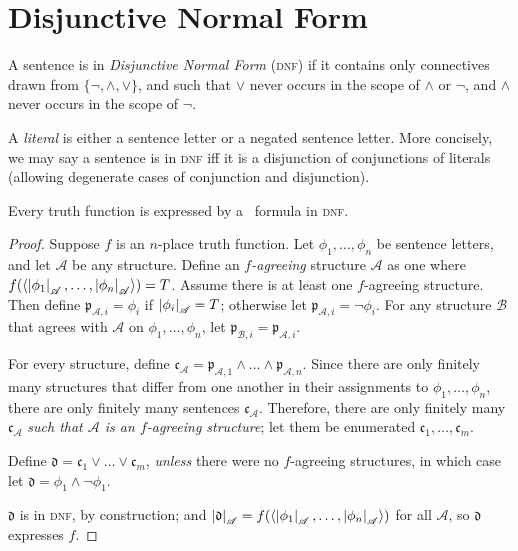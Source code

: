 

\section{Disjunctive Normal Form}


\begin{definition} A sentence is in \emph{Disjunctive Normal Form} (\textsc{\lowercase{DNF}}) if it contains only connectives drawn from $\{\neg,\wedge,\vee\}$, and such that $\vee$ never occurs in the scope of $\wedge$ or $\neg$, and $\wedge$ never occurs in the scope of $\neg$. \end{definition}

A \emph{literal} is either a sentence letter or a negated sentence letter. More concisely, we may say a sentence is in \textsc{\lowercase{DNF}} iff it is a disjunction of conjunctions of literals (allowing degenerate cases of conjunction and disjunction).

\begin{theorem}\label{dnf}
	Every truth function is expressed by a \lone\ formula in \textsc{\lowercase{DNF}}.
\begin{proof}	
Suppose $f$ is an $n$-place truth function. Let $\phi_{1},\ldots,\phi_{n}$ be  sentence letters, and let $\mathscr{A}$ be any structure.  Define an \emph{$f$-agreeing} structure $\mathscr{A}$ as one where $f(\langle\left|\phi_{1}\right|_{\mathscr{A}},\ldots,\left|\phi_{n}\right|_{\mathscr{A}}\rangle) = T$. Assume there is at least one $f$-agreeing structure. Then define $\mathfrak{p}_{\mathscr{A},i} = \phi_{i}$ if $\left|\phi_{i}\right|_{\mathscr{A}}=T$; otherwise let $\mathfrak{p}_{\mathscr{A},i} = \neg \phi_{i}$. 
For any structure $\mathscr{B}$ that agrees with $\mathscr{A}$ on $\phi_{1},\ldots,\phi_{n}$, let $\mathfrak{p}_{\mathscr{B},i}=\mathfrak{p}_{\mathscr{A},i}$.

For every structure, define $\mathfrak{c}_{\mathscr{A}} = \mathfrak{p}_{\mathscr{A},1}\wedge\ldots\wedge \mathfrak{p}_{\mathscr{A},n}$.  Since there are only finitely many structures that differ from one another in their assignments to $\phi_{1},\ldots,\phi_{n}$, there are only finitely many sentences $\mathfrak{c}_{\mathscr{A}}$.  Therefore, there are only finitely many $\mathfrak{c}_{\mathscr{A}}$ \emph{such that $\mathscr{A}$ is an $f$-agreeing structure}; let them be enumerated $\mathfrak{c}_{1},\ldots,\mathfrak{c}_{m}.$

 Define $\mathfrak{d} = \mathfrak{c}_{1} \vee \ldots \vee \mathfrak{c}_{m}$,  \emph{unless} there were no $f$-agreeing structures, in which case let $\mathfrak{d} = \phi_{1} \wedge \neg \phi_{1}$.



$\mathfrak{d}$ is in \textsc{\lowercase{DNF}}, by construction; and $\left|\mathfrak{d}\right|_{\mathscr{A}} = f(\langle\left|\phi_{1}\right|_{\mathscr{A}},\ldots,\left|\phi_{n}\right|_{\mathscr{A}}\rangle)$ for all $\mathscr{A}$, so $\mathfrak{d}$ expresses $f$. \end{proof}\end{theorem}

